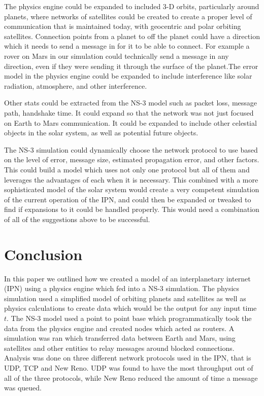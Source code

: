 \documentclass[a4paper,12pt]{article}
\begin{document}
The physics engine could be expanded to included 3-D orbits, particularly around
planets, where networks of satellites could be created to create a proper level
of communication that is maintained today, with geocentric and polar orbiting
satellites. Connection points from a planet to off the planet could have a
direction which it needs to send a message in for it to be able to connect. For
example a rover on Mars in our simulation could technically send a message in
any direction, even if they were sending it through the surface of the
planet.The error model in the physics engine could be expanded to include
interference like solar radiation, atmosphere, and other interference.

Other stats could be extracted from the NS-3 model such as packet loss, message
path, handshake time. It could expand so that the network was not just focused
on Earth to Mars communication. It could be expanded to include other celestial
objects in the solar system, as well as potential future objects.

The NS-3 simulation could dynamically choose the network protocol to use based
on the level of error, message size, estimated propagation error, and other
factors. This could build a model which uses not only one protocol but all of
them and leverages the advantages of each when it is necessary. This combined
with a more sophisticated model of the solar system would create a very
competent simulation of the current operation of the IPN, and could then be
expanded or tweaked to find if expansions to it could be handled properly. This
would need a combination of all of the suggestions above to be successful.

\section{Conclusion}

In this paper we outlined how we created a model of an interplanetary internet
(IPN) using a physics engine which fed into a NS-3 simulation. The physics
simulation used a simplified model of orbiting planets and satellites as well as
physics calculations to create data which would be the output for any input time
$t$. The NS-3 model used a point to point base which programmatically took the
data from the physics engine and created nodes which acted as routers. A
simulation was ran which transferred data between Earth and Mars, using
satellites and other entities to relay messages around blocked connections.
Analysis was done on three different network protocols used in the IPN, that is
UDP, TCP and New Reno. UDP was found to have the most throughput out of all of
the three protocols, while New Reno reduced the amount of time a message was
queued.

\printbibliography{}
\end{document}
